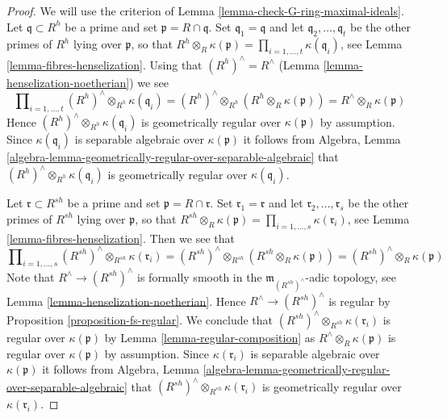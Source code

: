 \begin{proof}
We will use the criterion of Lemma \ref{lemma-check-G-ring-maximal-ideals}.
Let $\mathfrak q \subset R^h$ be a prime and set
$\mathfrak p = R \cap \mathfrak q$. Set $\mathfrak q_1 = \mathfrak q$
and let $\mathfrak q_2, \ldots, \mathfrak q_t$
be the other primes of $R^h$ lying over $\mathfrak p$, so that
$R^h \otimes_R \kappa(\mathfrak p) =
\prod\nolimits_{i = 1, \ldots, t} \kappa(\mathfrak q_i)$, see
Lemma \ref{lemma-fibres-henselization}.
Using that $(R^h)^\wedge = R^\wedge$
(Lemma \ref{lemma-henselization-noetherian}) we see
$$
\prod\nolimits_{i = 1, \ldots, t}
(R^h)^\wedge \otimes_{R^h} \kappa(\mathfrak q_i) =
(R^h)^\wedge \otimes_{R^h} (R^h \otimes_R \kappa(\mathfrak p)) =
R^\wedge \otimes_R \kappa(\mathfrak p)
$$
Hence $(R^h)^\wedge \otimes_{R^h} \kappa(\mathfrak q_i)$
is geometrically regular over $\kappa(\mathfrak p)$ by assumption.
Since $\kappa(\mathfrak q_i)$ is separable algebraic over $\kappa(\mathfrak p)$
it follows from Algebra, Lemma
\ref{algebra-lemma-geometrically-regular-over-separable-algebraic} that
$(R^h)^\wedge \otimes_{R^h} \kappa(\mathfrak q_i)$ is
geometrically regular over $\kappa(\mathfrak q_i)$.

\medskip\noindent
Let $\mathfrak r \subset R^{sh}$ be a prime and set
$\mathfrak p = R \cap \mathfrak r$. Set $\mathfrak r_1 = \mathfrak r$
and let $\mathfrak r_2, \ldots, \mathfrak r_s$
be the other primes of $R^{sh}$ lying over $\mathfrak p$, so that
$R^{sh} \otimes_R \kappa(\mathfrak p) =
\prod\nolimits_{i = 1, \ldots, s} \kappa(\mathfrak r_i)$, see
Lemma \ref{lemma-fibres-henselization}.
Then we see that
$$
\prod\nolimits_{i = 1, \ldots, s}
(R^{sh})^\wedge \otimes_{R^{sh}} \kappa(\mathfrak r_i) =
(R^{sh})^\wedge \otimes_{R^{sh}} (R^{sh} \otimes_R \kappa(\mathfrak p)) =
(R^{sh})^\wedge \otimes_R \kappa(\mathfrak p)
$$
Note that $R^\wedge \to (R^{sh})^\wedge$ is formally smooth
in the $\mathfrak m_{(R^{sh})^\wedge}$-adic topology, see
Lemma \ref{lemma-henselization-noetherian}.
Hence $R^\wedge \to (R^{sh})^\wedge$ is regular by
Proposition \ref{proposition-fs-regular}.
We conclude that $(R^{sh})^\wedge \otimes_{R^{sh}} \kappa(\mathfrak r_i)$
is regular over $\kappa(\mathfrak p)$ by
Lemma \ref{lemma-regular-composition} as
$R^\wedge \otimes_R \kappa(\mathfrak p)$ is regular over $\kappa(\mathfrak p)$
by assumption. Since $\kappa(\mathfrak r_i)$ is separable algebraic over
$\kappa(\mathfrak p)$
it follows from Algebra, Lemma
\ref{algebra-lemma-geometrically-regular-over-separable-algebraic} that
$(R^{sh})^\wedge \otimes_{R^{sh}} \kappa(\mathfrak r_i)$ is
geometrically regular over $\kappa(\mathfrak r_i)$.
\end{proof}


